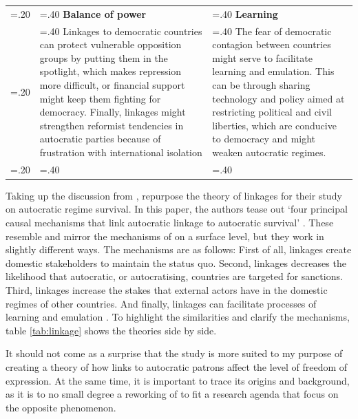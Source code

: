 \begin{table}[p]
{\begin{tabularx}{\textwidth} {
 >{\centering\arraybackslash\hsize=.20\hsize}X 
 >{\noindent\justifying\arraybackslash\hsize=.40\hsize}X 
 >{\noindent\justifying\arraybackslash\hsize=.40\hsize}X}
 & \textbf{Balance of power}
 & \textbf{Learning} \\
\addlinespace
 & Linkages to democratic countries can protect vulnerable opposition groups by putting them in the spotlight, which makes repression more difficult, or financial support might keep them fighting for democracy. Finally, linkages might strengthen reformist tendencies in autocratic parties because of frustration with international isolation
 & The fear of democratic contagion between countries might serve to facilitate learning and emulation. This can be through sharing technology and policy aimed at restricting political and civil liberties, which are conducive to democracy and might weaken autocratic regimes. \\
\bottomrule
 
 \multicolumn{3}{p{\textwidth}}{\raggedright{\textit{Mechanisms are found in \citet[pp. 383-386]{levitsky_linkage_2006} and \citet[pp. 1225-1227]{tansey_ties_2017}}}}

\end{tabularx}
} %
\end{table}

Taking up the discussion from \citeauthor{levitsky_linkage_2006}, \citet{tansey_ties_2017} repurpose the theory of linkages for their study on autocratic regime survival. In this paper, the authors tease out `four principal causal mechanisms that link autocratic linkage to autocratic survival' \citep[p. 1225]{tansey_ties_2017}. These resemble and mirror the mechanisms of \citeauthor{levitsky_linkage_2006} on a surface level, but they work in slightly different ways. The mechanisms are as follows: First of all, linkages create domestic stakeholders to maintain the status quo. Second, linkages decreases the likelihood that autocratic, or autocratising, countries are targeted for sanctions. Third, linkages increase the stakes that external actors have in the domestic regimes of other countries. And finally, linkages can facilitate processes of learning and emulation \citep[pp. 1225-1227]{tansey_ties_2017}. To highlight the similarities and clarify the mechanisms, table \ref{tab:linkage} shows the theories side by side. 

It should not come as a surprise that the \citeauthor{tansey_ties_2017} study is more suited to my purpose of creating a theory of how links to autocratic patrons affect the level of freedom of expression. At the same time, it is important to trace its origins and background, as it is to no small degree a reworking of \citeauthor{levitsky_linkage_2006} to fit a research agenda that focus on the opposite phenomenon. 

